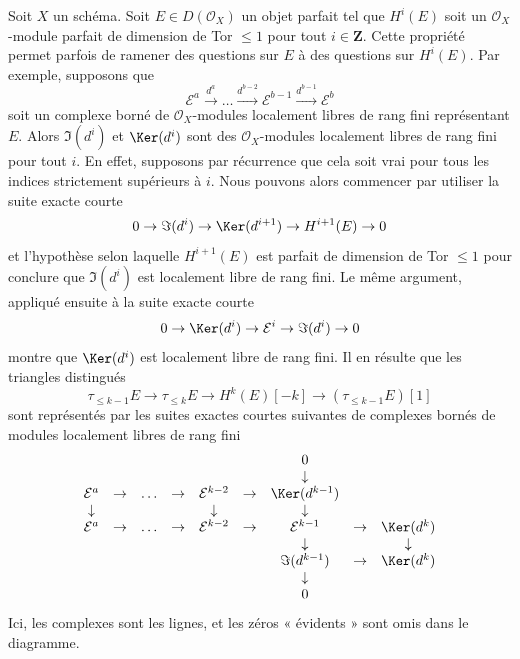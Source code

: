 \begin{remark}
\label{remark-when-you-have-a-complex}
Soit $X$ un schéma. Soit $E \in D(\mathcal{O}_X)$ un objet parfait tel que
$H^i(E)$ soit un $\mathcal{O}_X$-module parfait de dimension de Tor $\leq 1$
pour tout $i \in \mathbf{Z}$. Cette propriété permet parfois de ramener
des questions sur $E$ à des questions sur $H^i(E)$. Par exemple, supposons que
$$
\mathcal{E}^a \xrightarrow{d^a} \ldots
\xrightarrow{d^{b - 2}} \mathcal{E}^{b - 1}
\xrightarrow{d^{b - 1}} \mathcal{E}^b
$$
soit un complexe borné de $\mathcal{O}_X$-modules localement libres
de rang fini représentant $E$. Alors $\Im(d^i)$ et $\Ker(d^i)$ sont des
$\mathcal{O}_X$-modules localement libres de rang fini pour tout $i$. En effet, supposons par
récurrence que cela soit vrai pour tous les indices strictement supérieurs à $i$.
Nous pouvons alors commencer par utiliser la suite exacte courte
$$
0 \to \Im(d^i) \to \Ker(d^{i + 1}) \to H^{i + 1}(E) \to 0
$$
et l'hypothèse selon laquelle $H^{i + 1}(E)$ est parfait de dimension de Tor $\leq 1$
pour conclure que $\Im(d^i)$ est localement libre de rang fini.
Le même argument, appliqué ensuite à la suite exacte courte
$$
0 \to \Ker(d^i) \to \mathcal{E}^i \to \Im(d^i) \to 0
$$
montre que $\Ker(d^i)$ est localement libre de rang fini.
Il en résulte que les triangles distingués
$$
\tau_{\leq k - 1}E \to \tau_{\leq k}E \to H^k(E)[-k] \to
(\tau_{\leq k - 1}E)[1]
$$
sont représentés par les suites exactes courtes suivantes de
complexes bornés de modules localement libres de rang fini
$$
\begin{matrix}
& &
& &
& &
0 \\
& &
& &
& &
\downarrow \\
\mathcal{E}^a & \to &
\ldots & \to &
\mathcal{E}^{k - 2} & \to &
\Ker(d^{k - 1}) \\
\downarrow & &
& &
\downarrow & &
\downarrow \\
\mathcal{E}^a & \to &
\ldots & \to &
\mathcal{E}^{k - 2} & \to &
\mathcal{E}^{k - 1} & \to &
\Ker(d^k) \\
& &
& &
& &
\downarrow & &
\downarrow \\
& &
& &
& &
\Im(d^{k - 1}) & \to &
\Ker(d^k) \\
& &
& &
& &
\downarrow \\
& &
& &
& &
0
\end{matrix}
$$
Ici, les complexes sont les lignes, et les zéros « évidents »
sont omis dans le diagramme.
\end{remark}





